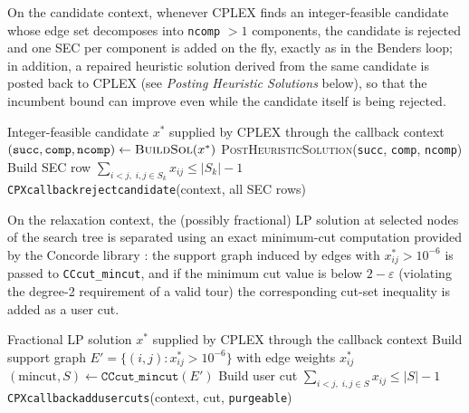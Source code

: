 \documentclass{article}
\begin{document}
On the candidate context, whenever CPLEX finds an integer-feasible candidate whose edge set
decomposes into \texttt{ncomp} $> 1$ components, the candidate is rejected and one SEC per
component is added on the fly, exactly as in the Benders loop; in addition, a repaired
heuristic solution derived from the same candidate is posted back to CPLEX (see
\textit{Posting Heuristic Solutions} below), so that the incumbent bound can improve even while
the candidate itself is being rejected.

\begin{algorithm}[H]
\caption{Integer-Candidate Callback: SEC Rejection (\texttt{my\_callback\_candidate})}
\label{alg:cb_candidate}
\begin{algorithmic}[1]
\Require Integer-feasible candidate $x^*$ supplied by CPLEX through the callback context
\State $(\texttt{succ}, \texttt{comp}, \texttt{ncomp}) \leftarrow \textsc{BuildSol}(x^*)$
    \State \Return {}
\EndIf
\State \textsc{PostHeuristicSolution}(\texttt{succ}, \texttt{comp}, \texttt{ncomp}) 
    \State Build SEC row $\displaystyle\sum_{i<j,\; i,j \in S_k} x_{ij} \leq |S_k| - 1$
\EndFor
\State \texttt{CPXcallbackrejectcandidate}(context, all SEC rows)
\end{algorithmic}
\end{algorithm}

On the relaxation context, the (possibly fractional) LP solution at selected nodes of the
search tree is separated using an exact minimum-cut computation provided by the Concorde
library \cite{applegate2006}: the support graph induced by edges with $x^*_{ij} > 10^{-6}$ is
passed to \texttt{CCcut\_mincut}, and if the minimum cut value is below $2 - \varepsilon$
(violating the degree-2 requirement of a valid tour) the corresponding cut-set inequality is
added as a user cut.

\begin{algorithm}[H]
\caption{Relaxation Callback: Fractional Cut Separation via Concorde (\texttt{my\_callback\_relaxation})}
\label{alg:cb_relaxation}
\begin{algorithmic}[1]
\Require Fractional LP solution $x^*$ supplied by CPLEX through the callback context
\State Build support graph $E' = \{(i,j) : x^*_{ij} > 10^{-6}\}$ with edge weights $x^*_{ij}$
\State $(\text{mincut}, S) \leftarrow \texttt{CCcut\_mincut}(E')$
    \State Build user cut $\displaystyle\sum_{i<j,\; i,j \in S} x_{ij} \leq |S| - 1$
    \State \texttt{CPXcallbackaddusercuts}(context, cut, \texttt{purgeable})
\EndIf
\end{algorithmic}
\end{algorithm}
\end{document}

